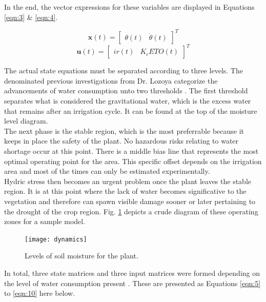 \documentclass[12pt]{article}
\begin{document}
In the end, the vector expressions for these variables are displayed in Equations \ref{eqn:3} \& \ref{eqn:4}.

\begin{equation}
\label{eqn:3}
\mathbf{x}(t) = 
\begin{bmatrix}
\theta(t) & \dot{\theta}(t)
\end{bmatrix}
^T
\end{equation}
\begin{equation}
\label{eqn:4}
\mathbf{u}(t) = 
\begin{bmatrix}
ir(t) & K_c ETO(t)
\end{bmatrix}
^T
\end{equation}

The actual state equations must be separated according to three levels. The denominated previous investigations from Dr. Lozoya categorize the advancements of water consumption unto two thresholds \cite{camilo1}. The first threshold separates what is considered the gravitational water, which is the excess water that remains after an irrigation cycle. It can be found at the top of the moisture level diagram. \\

The next phase is the stable region, which is the most preferrable because it keeps in place the safety of the plant. No hazardous risks relating to water shortage occur at this point. There is a middle bias line that represents the most optimal operating point for the area. This specific offset depends on the irrigation area and most of the times can only be estimated experimentally. \\

Hydric stress then becomes an urgent problem once the plant leaves the stable region. It is at this point where the lack of water becomes significative to the vegetation and therefore can spawn visible damage sooner or later pertaining to the drought of the crop region. Fig. \ref{fig:1} depicts a crude diagram of these operating zones for a sample model. \\

\begin{figure}[h]
\texttt{[image: dynamics]}
\label{fig:1}
\centering
\caption{Levels of soil moisture for the plant.}
\end{figure}

In total, three state matrices and three input matrices were formed depending on the level of water consumption present \cite{camilo3}. These are presented as Equations \ref{eqn:5} to \ref{eqn:10} here below. \\
\end{document}
